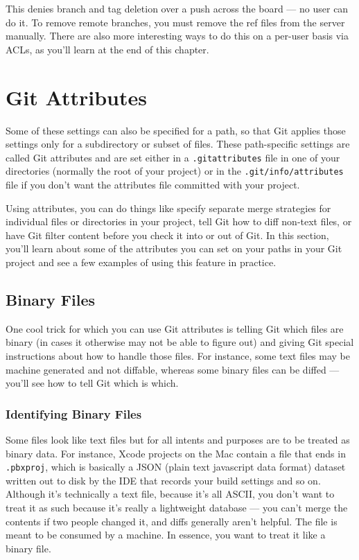 \documentclass[a4paper]{book}
\newcounter{tab}[chapter]
\begin{document}
This denies branch and tag deletion over a push across the board --- no user can do it. To remove remote branches, you must remove the ref files from the server manually. There are also more interesting ways to do this on a per-user basis via ACLs, as you'll learn at the end of this chapter.

\section{Git Attributes}

Some of these settings can also be specified for a path, so that Git applies those settings only for a subdirectory or subset of files. These path-specific settings are called Git attributes and are set either in a \texttt{.gitattributes} file in one of your directories (normally the root of your project) or in the \texttt{.git/info/attributes} file if you don't want the attributes file committed with your project.

Using attributes, you can do things like specify separate merge strategies for individual files or directories in your project, tell Git how to diff non-text files, or have Git filter content before you check it into or out of Git. In this section, you'll learn about some of the attributes you can set on your paths in your Git project and see a few examples of using this feature in practice.

\subsection{Binary Files}

One cool trick for which you can use Git attributes is telling Git which files are binary (in cases it otherwise may not be able to figure out) and giving Git special instructions about how to handle those files. For instance, some text files may be machine generated and not diffable, whereas some binary files can be diffed --- you'll see how to tell Git which is which.

\subsubsection{Identifying Binary Files}

Some files look like text files but for all intents and purposes are to be treated as binary data. For instance, Xcode projects on the Mac contain a file that ends in \texttt{.pbxproj}, which is basically a JSON (plain text javascript data format) dataset written out to disk by the IDE that records your build settings and so on. Although it's technically a text file, because it's all ASCII, you don't want to treat it as such because it's really a lightweight database --- you can't merge the contents if two people changed it, and diffs generally aren't helpful. The file is meant to be consumed by a machine. In essence, you want to treat it like a binary file.
\end{document}
